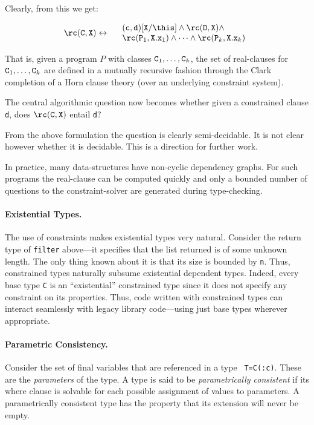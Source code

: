 \noindent Clearly, from this we get:

$$\rc({\tt C},{\tt X}) \leftrightarrow 
\begin{array}{l}
\quad ({\tt c},{\tt d})[{\tt X}/\this] \wedge   \rc({\tt D},{\tt
X}) \wedge \\
\quad \rc({\tt P}_1, {\tt X.x}_1)\wedge \cdots \wedge \rc({\tt P}_k, {\tt X.x}_k)
\end{array}
$$
  
That is, given a program $P$ with classes ${\tt C}_1,\ldots, {\tt
C}_k$, the set of real-clauses for ${\tt C}_1,\ldots, {\tt C}_k$ are
defined in a mutually recursive fashion through the Clark completion
of a Horn clause theory (over an underlying constraint system).

The central algorithmic question now becomes whether given a
constrained clause {\tt d}, does $\rc({\tt C},{\tt X})$ entail {\tt d}? 

From the above formulation the question is clearly semi-decidable. It
is not clear however whether it is decidable. This is a direction for
further work.

In practice, many data-structures have non-cyclic dependency
graphs. For such programs the real-clause can be computed quickly and
only a bounded number of questions to the constraint-solver are
generated during type-checking.

\paragraph{Existential Types.}
The use of constraints makes existential types very natural.  Consider
the return type of {\tt filter} above---it specifies that the list
returned is of some unknown length. The only thing known about it is
that its size is bounded by {\tt n}. Thus, constrained types naturally
subsume existential dependent types. Indeed, every base type {\tt C}
is an ``existential'' constrained type since it does not specify any
constraint on its properties. Thus, code written with constrained types
can interact seamlessly with legacy library code---using just base
types wherever appropriate.

\paragraph{Parametric Consistency.}
Consider the set of final variables that are referenced in a type {\tt
T=C(:c)}. These are the {\em parameters} of the type. A type is said
to be {\em parametrically consistent} if its where clause is solvable
for each possible assignment of values to parameters.  A
parametrically consistent type has the property that its extension
will never be empty. 

